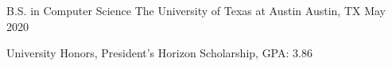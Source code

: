 

\begin{cventries}

  \cventry
  {B.S. in Computer Science} %
  {The University of Texas at Austin} %
  {Austin, TX} %
  {May 2020} %
  {
    \begin{cvitems} %
      \item {University Honors, President's Horizon Scholarship, GPA: 3.86}
    \end{cvitems}
  }

\end{cventries}
